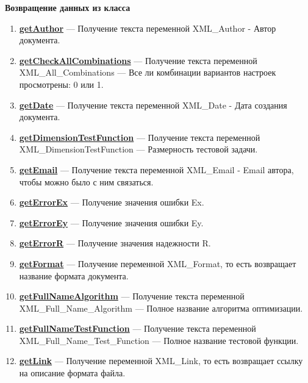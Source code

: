 \documentclass[a4paper,12pt]{article}
\begin{document}
\textbf{Возвращение данных из класса}
\begin{enumerate}

\item \textbf{\hyperref[getAuthor]{getAuthor}} --- Получение текста переменной XML\_Author - Автор документа.

\item \textbf{\hyperref[getCheckAllCombinations]{getCheckAllCombinations}} --- Получение текста переменной  XML\_All\_Combinations --- Все ли комбинации вариантов настроек просмотрены: 0 или 1.

\item \textbf{\hyperref[getDate]{getDate}} --- Получение текста переменной  XML\_Date - Дата создания документа.

\item \textbf{\hyperref[getDimensionTestFunction]{getDimensionTestFunction}} --- Получение текста переменной  XML\_DimensionTestFunction --- Размерность тестовой задачи.

\item \textbf{\hyperref[getEmail]{getEmail}} --- Получение текста переменной  XML\_Email - Email автора, чтобы можно было с ним связаться.

\item \textbf{\hyperref[getErrorEx]{getErrorEx}} --- Получение значения ошибки Ex.

\item \textbf{\hyperref[getErrorEy]{getErrorEy}} --- Получение значения ошибки Ey.

\item \textbf{\hyperref[getErrorR]{getErrorR}} --- Получение значения надежности R.

\item \textbf{\hyperref[getFormat]{getFormat}} --- Получение переменной XML\_Format, то есть возвращает название формата документа.

\item \textbf{\hyperref[getFullNameAlgorithm]{getFullNameAlgorithm}} --- Получение текста переменной  XML\_Full\_Name\_Algorithm --- Полное название алгоритма оптимизации.

\item \textbf{\hyperref[getFullNameTestFunction]{getFullNameTestFunction}} --- Получение текста переменной  XML\_Full\_Name\_Test\_Function --- Полное название тестовой функции.

\item \textbf{\hyperref[getLink]{getLink}} --- Получение переменной XML\_Link, то есть возвращает ссылку на описание формата файла.


\end{enumerate}
\end{document}
